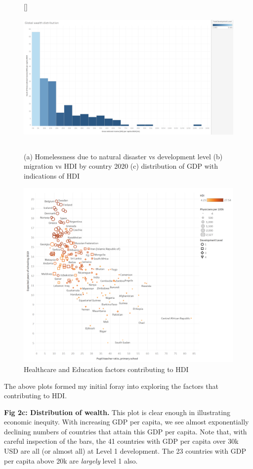 \documentclass[ 10pt ]{fphw}
\begin{document}
\begin{figure}[hb]
\begin{minipage}[b][\ht\measurebox][s]{.55\textwidth}
  []
  {\label{fig:figC}\includegraphics[width=\textwidth,height=7cm]{wealth.png}}
\end{minipage}
\caption{(a) Homelessness due to natural disaster vs development level (b) migration vs HDI by country 2020 (c) distribution of GDP with indications of HDI}
\label{fig:quafdPLOT}
\end{figure}

\clearpage

\begin{center}
\begin{figure}[h!]
    \centering
    \label{fig1:healthED}
	\includegraphics[width=0.75\columnwidth]{healthEducation.png} 
	\caption{Healthcare and Education factors contributing to HDI}
	\end{figure}
\end{center}

The above plots formed my initial foray into exploring the factors that contributing to HDI.

\vspace{0.3cm}

\textbf{Fig 2c: Distribution of wealth.} This plot is clear enough in illustrating economic inequity. With increasing GDP per capita, we see almost exponentially declining numbers of countries that attain this GDP per capita. Note that, with careful inspection of the bars, the 41 countries with GDP per capita over 30k USD are all (or almost all) at Level 1 development. The 23 countries with GDP per capita above 20k are \textit{largely} level 1 also.
\end{document}
